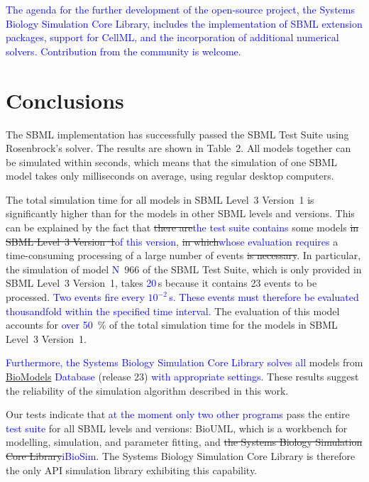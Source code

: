 \documentclass[10pt]{bmc_article}
\newcommand{\numero}{\mbox{N\hspace{-0.075em}\raisebox{0.25em}{\relsize{-2}\b{o}}}}
\newenvironment{bmcformat}{\fussy\setboolean{publ}{true}}{\fussy}
\newcommand{\COR}[1]                      {\textcolor{blue}{#1}}
\begin{document}
\begin{bmcformat}
\COR{The agenda for the further development of the open-source project, the Systems Biology Simulation Core Library,
includes the implementation of \acs{SBML} extension packages, support for CellML, and the incorporation of additional numerical solvers.
Contribution from the community is welcome.}

\section*{Conclusions}

The \acs{SBML} implementation has successfully passed the
SBML Test Suite \COR{\cite{SBMLtestSuite2013}} using Rosenbrock's solver.
The results are shown in Table~2.
All models together can be simulated within seconds, which means that the simulation
of one \acs{SBML} model takes only milliseconds on average, using regular desktop computers.

The total simulation time for all models in \acs{SBML} Level~3 Version~1 is significantly
higher than for the models in other \acs{SBML} levels and versions.
This can be explained by the fact that \sout{there are}\COR{the test suite contains}
some models \sout{in \acs{SBML} Level~3 Version~1}\COR{of this version}, 
\sout{in which}\COR{whose evaluation requires} 
a time-consuming processing of a large number of events\sout{ is necessary}.
In particular, the simulation of model \COR{\numero~}966 of the SBML Test Suite,
which is only provided in \acs{SBML} Level~3 Version~1, takes \COR{20}\,s because it contains 23 events to be processed.
\COR{Two events fire every $10^{-2}$\,s.
These events must therefore be evaluated thousandfold within the specified time interval.}
The evaluation of this model accounts for \COR{over 50}~\% of the total simulation time for the models in \acs{SBML} Level~3 Version~1.
 
\COR{Furthermore, the Systems Biology Simulation Core Library
solves all}
models from \href{http://biomodels.net}{BioModels} \COR{Database} (release 23) \COR{with appropriate settings}.
These results suggest the reliability of the simulation algorithm described in
this work.

Our tests indicate that \COR{at the moment only two other programs} pass the entire \COR{test suite} for all 
\acs{SBML} levels and versions: BioUML, which is a workbench for modelling, simulation,
and parameter fitting, and \sout{the Systems Biology Simulation Core Library}\COR{iBioSim}.
The Systems Biology Simulation Core Library is therefore the only \acs{API} simulation
library exhibiting this capability.


\end{bmcformat}
\end{document}
